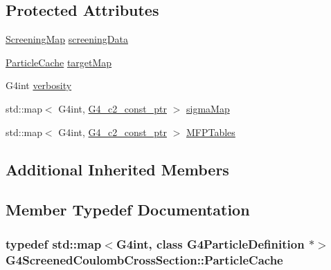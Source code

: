 \subsection*{Protected Attributes}
\begin{DoxyCompactItemize}
\item 
\hyperlink{classG4ScreenedCoulombCrossSection_a936cd19a7a45353257f74f1e061de448}{Screening\+Map} \hyperlink{classG4ScreenedCoulombCrossSection_acee3c711dd831c718fc22d5c98334f56}{screening\+Data}
\item 
\hyperlink{classG4ScreenedCoulombCrossSection_a89d84b815b40ba7fe83462843964d3e4}{Particle\+Cache} \hyperlink{classG4ScreenedCoulombCrossSection_a4f47a69e60be10d7040de1fbc9612887}{target\+Map}
\item 
G4int \hyperlink{classG4ScreenedCoulombCrossSection_a9b29c3d5aa9807d66afee4e59905d7e3}{verbosity}
\item 
std\+::map$<$ G4int, \hyperlink{G4ScreenedNuclearRecoil_8hh_a1252ac0bd90119ed9cc3298296b77c2a}{G4\+\_\+c2\+\_\+const\+\_\+ptr} $>$ \hyperlink{classG4ScreenedCoulombCrossSection_ae6c847c6a7aac54186ab96ea4d44be3a}{sigma\+Map}
\item 
std\+::map$<$ G4int, \hyperlink{G4ScreenedNuclearRecoil_8hh_a1252ac0bd90119ed9cc3298296b77c2a}{G4\+\_\+c2\+\_\+const\+\_\+ptr} $>$ \hyperlink{classG4ScreenedCoulombCrossSection_a4edd4f54a2c248eb398f06127962e550}{M\+F\+P\+Tables}
\end{DoxyCompactItemize}
\subsection*{Additional Inherited Members}


\subsection{Member Typedef Documentation}
\subsubsection[{\texorpdfstring{Particle\+Cache}{ParticleCache}}]{\setlength{\rightskip}{0pt plus 5cm}typedef std\+::map$<$G4int, class G4\+Particle\+Definition $\ast$$>$ {\bf G4\+Screened\+Coulomb\+Cross\+Section\+::\+Particle\+Cache}}\hypertarget{classG4ScreenedCoulombCrossSection_a89d84b815b40ba7fe83462843964d3e4}{}\label{classG4ScreenedCoulombCrossSection_a89d84b815b40ba7fe83462843964d3e4}

